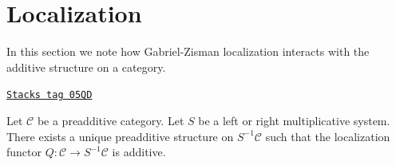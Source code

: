 \section{Localization}
\label{homology-section-localization}
In this section we note how Gabriel-Zisman localization interacts with
the additive structure on a category.

\begin{lemma}
\label{homology-lemma-localization-preadditive}
\href{https://stacks.math.columbia.edu/tag/05QD}{\texttt{Stacks tag 05QD}}

Let $\mathcal{C}$ be a preadditive category.
Let $S$ be a left or right multiplicative system.
There exists a unique preadditive structure on
$S^{-1}\mathcal{C}$ such that the localization functor
$Q : \mathcal{C} \to S^{-1}\mathcal{C}$ is additive.
\end{lemma}

